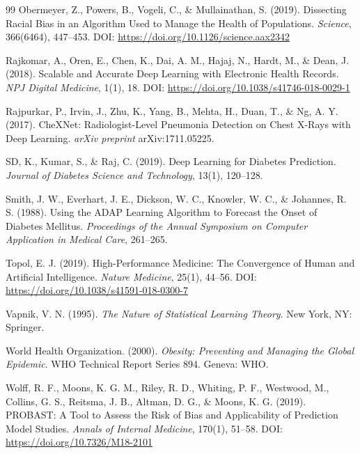 \begin{thebibliography}{99}
Obermeyer, Z., Powers, B., Vogeli, C., \& Mullainathan, S. (2019). Dissecting 
Racial Bias in an Algorithm Used to Manage the Health of Populations. 
\textit{Science}, 366(6464), 447--453. 
DOI: \url{https://doi.org/10.1126/science.aax2342}

Rajkomar, A., Oren, E., Chen, K., Dai, A. M., Hajaj, N., Hardt, M., \& 
Dean, J. (2018). Scalable and Accurate Deep Learning with Electronic Health 
Records. \textit{NPJ Digital Medicine}, 1(1), 18. 
DOI: \url{https://doi.org/10.1038/s41746-018-0029-1}

Rajpurkar, P., Irvin, J., Zhu, K., Yang, B., Mehta, H., Duan, T., \& 
Ng, A. Y. (2017). CheXNet: Radiologist-Level Pneumonia Detection on Chest 
X-Rays with Deep Learning. \textit{arXiv preprint} arXiv:1711.05225.

SD, K., Kumar, S., \& Raj, C. (2019). Deep Learning for Diabetes Prediction. 
\textit{Journal of Diabetes Science and Technology}, 13(1), 120--128.

Smith, J. W., Everhart, J. E., Dickson, W. C., Knowler, W. C., \& 
Johannes, R. S. (1988). Using the ADAP Learning Algorithm to Forecast the 
Onset of Diabetes Mellitus. \textit{Proceedings of the Annual Symposium on 
Computer Application in Medical Care}, 261--265.

Topol, E. J. (2019). High-Performance Medicine: The Convergence of Human and 
Artificial Intelligence. \textit{Nature Medicine}, 25(1), 44--56. 
DOI: \url{https://doi.org/10.1038/s41591-018-0300-7}

Vapnik, V. N. (1995). \textit{The Nature of Statistical Learning Theory}. 
New York, NY: Springer.

World Health Organization. (2000). \textit{Obesity: Preventing and Managing 
the Global Epidemic}. WHO Technical Report Series 894. Geneva: WHO.

Wolff, R. F., Moons, K. G. M., Riley, R. D., Whiting, P. F., Westwood, M., 
Collins, G. S., Reitsma, J. B., Altman, D. G., \& Moons, K. G. (2019). 
PROBAST: A Tool to Assess the Risk of Bias and Applicability of Prediction 
Model Studies. \textit{Annals of Internal Medicine}, 170(1), 51--58. 
DOI: \url{https://doi.org/10.7326/M18-2101}

\end{thebibliography}
